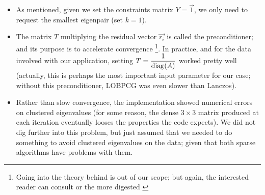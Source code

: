 \begin{itemize}
\item As mentioned, given we set the constraints matrix $Y = \vec{1}$,
  we only need to request the smallest eigenpair (set $k=1$). 
\item The matrix $T$ multiplying the residual vector $\vec{r_i}$ is called
  the preconditioner; and its purpose is to accelerate
  convergence \footnote{Going into the theory behind is out of
    our scope; but again,  the interested reader can consult \cite{knyazev01}
    or the more digested \cite{lashuk07}}. In practice, and for the
  data involved with our application, setting $T =
  \dfrac{1}{\operatorname{diag}(A)}$ worked pretty well (actually, this is
  perhaps the most important input parameter for our case; without
  this preconditioner, LOBPCG was even slower than Lanczos). 
\item Rather than slow convergence, the implementation showed
  numerical errors on clustered eigenvalues (for some reason, the
  dense $3 \times 3$ matrix produced at each iteration eventually
  looses the properties the code expects). We did not dig further into
  this problem, but just assumed that we needed to do something to
  avoid clustered eigenvalues on the data; given that both sparse
  algorithms have problems with them.
\end{itemize}

